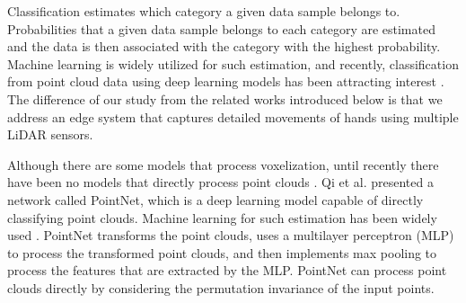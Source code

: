 
Classification estimates which category a given data sample belongs to. 
  Probabilities that a given data sample belongs to each category are estimated and the data is then associated with the category with the highest probability. 
  Machine learning is widely utilized for such estimation, and recently, classification from point cloud data using deep learning models has been attracting interest \cite{grandini2020metrics}.
  The difference of our study from the related works introduced below is that we address an edge system that captures detailed movements of hands using multiple LiDAR sensors. 

Although there are some models that process voxelization, until recently there have been no models that directly process point clouds \cite{Wu_2015_CVPR,7353481,Qi_2016_CVPR}.
Qi et al. presented a network called PointNet, which is a deep learning model capable of directly classifying point clouds. 
    Machine learning for such estimation has been widely used \cite{grandini2020metrics}. 
    PointNet transforms the point clouds, uses a multilayer perceptron (MLP) to process the transformed point clouds, and then implements max pooling to process the features that are extracted by the MLP. 
    PointNet can process point clouds directly by considering the permutation invariance of the input points. 

